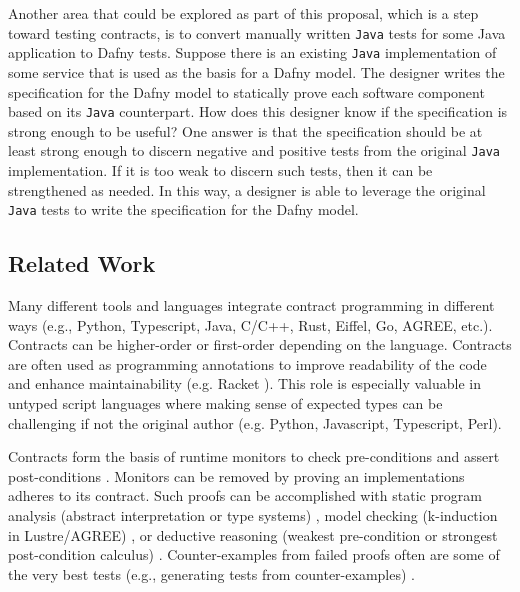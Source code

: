 \documentclass[11pt,onecolumn,notitlepage]{article}
\begin{document}
Another area that could be explored as part of this proposal, which is a step toward testing contracts, is to convert manually written \texttt{Java} tests for some Java application to Dafny tests. Suppose there is an existing \texttt{Java} implementation of some service that is used as the basis for a Dafny model. The designer writes the specification for the Dafny model to statically prove each software component based on its \texttt{Java} counterpart. How does this designer know if the specification is strong enough to be useful? One answer is that the specification should be at least strong enough to discern negative and positive tests from the original \texttt{Java} implementation. If it is too weak to discern such tests, then it can be strengthened as needed. In this way, a designer is able to leverage the original \texttt{Java} tests to write the specification for the Dafny model.
 
\subsection*{Related Work}

Many different tools and languages integrate contract programming in different ways (e.g., Python, Typescript, Java, C/C++, Rust, Eiffel, Go, AGREE, etc.). Contracts can be higher-order or first-order depending on the language. Contracts are often used as programming annotations to improve readability of the code and enhance maintainability (e.g. Racket \cite{10.1145/3022670.2951930,10.1145/583852.581484,10.1145/2034574.2034800}). This role is especially valuable in untyped script languages where making sense of expected types can be challenging if not the original author (e.g. Python, Javascript, Typescript, Perl). 

Contracts form the basis of runtime monitors to check pre-conditions and assert post-conditions \cite{10.1007/978-3-642-28869-2_11}. Monitors can be removed by proving an implementations adheres to its contract. Such proofs can be accomplished with static program analysis (abstract interpretation or type systems) \cite{10.1145/3158139}, model checking (k-induction in Lustre/AGREE) \cite{10.1007/978-3-642-23702-7_26,10.1007/978-3-319-96142-2_3, 10.1007/978-3-642-28891-3_13, 10.1007/3-540-48249-0_34, 10.1007/978-3-319-41540-6_29}, or deductive reasoning (weakest pre-condition or strongest post-condition calculus) \cite{10.1007/3-540-45314-8_21, Huisman2016, 10.1007/978-3-642-27705-4_7, DBLP:series/lncs/10001, 10.1007/978-3-030-03421-4_4}. Counter-examples from failed proofs often are some of the very best tests (e.g., generating tests from counter-examples) \cite{Billeter:Thesis:2008}.
\end{document}
